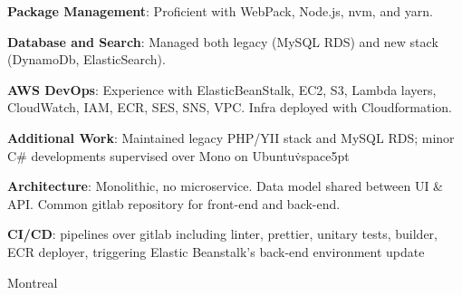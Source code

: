 \documentclass[
  a4paper,
   maincolor=cvblue,
   sectioncolor=cvblue,
   sidebarwidth=0.323\paperwidth,
]{fortysecondscv}
\begin{document}
\begin{cvtableNew}
{        \textbf{Package Management}: Proficient with WebPack, Node.js, nvm, and yarn.\vspace{5pt}

        \textbf{Database and Search}: Managed both legacy (MySQL RDS) and new stack (DynamoDb, ElasticSearch).\vspace{5pt}

        \textbf{AWS DevOps}: Experience with ElasticBeanStalk, EC2, S3, Lambda layers, CloudWatch, IAM, ECR, SES, SNS, VPC. Infra deployed with Cloudformation.\vspace{5pt}

        \textbf{Additional Work}: Maintained legacy PHP/YII stack and MySQL RDS; minor C\# developments supervised over Mono on Ubuntu\.vspace{5pt}

        \textbf{Architecture}: Monolithic, no microservice. Data model shared between UI \& API. Common gitlab repository for front-end and back-end.\vspace{5pt}

        \textbf{CI/CD}: pipelines over gitlab including linter, prettier, unitary tests, builder, ECR deployer, triggering Elastic Beanstalk's back-end environment update
      }
    {Montreal} %
\end{cvtableNew}








\newpage
\makebacksidebar
\end{document}
